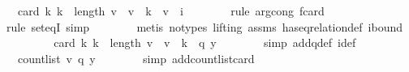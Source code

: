 \begin{isabellebody}
\ {\isachardoublequoteopen}{\isachardot}{\kern0pt}{\isachardot}{\kern0pt}{\isachardot}{\kern0pt}\ {\isacharequal}{\kern0pt}\ card\ {\isacharbraceleft}{\kern0pt}k{\isachardot}{\kern0pt}\ k\ {\isacharless}{\kern0pt}\ length\ v\ {\isasymand}\ v\ {\isacharbang}{\kern0pt}\ k\ {\isacharequal}{\kern0pt}\ v\ {\isacharbang}{\kern0pt}\ i{\isacharbraceright}{\kern0pt}{\isachardoublequoteclose}\isanewline
\ \ \ \ \ \ \isamarkupfalse%
\ {\isacharparenleft}{\kern0pt}rule\ arg{\isacharunderscore}{\kern0pt}cong{\isacharbrackleft}{\kern0pt}\ f{\isacharequal}{\kern0pt}{\isachardoublequoteopen}card{\isachardoublequoteclose}{\isacharbrackright}{\kern0pt}{\isacharparenright}{\kern0pt}\isanewline
\ \ \ \ \ \ \isamarkupfalse%
\ {\isacharparenleft}{\kern0pt}rule\ set{\isacharunderscore}{\kern0pt}eqI{\isacharcomma}{\kern0pt}\ simp{\isacharparenright}{\kern0pt}\isanewline
\ \ \ \ \ \ \isamarkupfalse%
\ {\isacharparenleft}{\kern0pt}metis\ {\isacharparenleft}{\kern0pt}no{\isacharunderscore}{\kern0pt}types{\isacharcomma}{\kern0pt}\ lifting{\isacharparenright}{\kern0pt}\ assms{\isacharparenleft}{\kern0pt}{}{\isacharparenright}{\kern0pt}\ has{\isacharunderscore}{\kern0pt}eq{\isacharunderscore}{\kern0pt}relation{\isacharunderscore}{\kern0pt}def\ i{\isacharunderscore}{\kern0pt}bound{\isacharparenright}{\kern0pt}\isanewline
\ \ \ \ \isamarkupfalse%
\ \isamarkupfalse%
\ {\isachardoublequoteopen}{\isachardot}{\kern0pt}{\isachardot}{\kern0pt}{\isachardot}{\kern0pt}\ {\isacharequal}{\kern0pt}\ card\ {\isacharbraceleft}{\kern0pt}k{\isachardot}{\kern0pt}\ k\ {\isacharless}{\kern0pt}\ length\ v\ {\isasymand}\ v\ {\isacharbang}{\kern0pt}\ k\ {\isacharequal}{\kern0pt}\ q\ y{\isacharbraceright}{\kern0pt}{\isachardoublequoteclose}\isanewline
\ \ \ \ \ \ \isamarkupfalse%
\ {\isacharparenleft}{\kern0pt}simp\ add{\isacharcolon}{\kern0pt}q{\isacharunderscore}{\kern0pt}def\ i{\isacharunderscore}{\kern0pt}def{\isacharparenright}{\kern0pt}\isanewline
\ \ \ \ \isamarkupfalse%
\ \isamarkupfalse%
\ {\isachardoublequoteopen}{\isachardot}{\kern0pt}{\isachardot}{\kern0pt}{\isachardot}{\kern0pt}\ {\isacharequal}{\kern0pt}\ count{\isacharunderscore}{\kern0pt}list\ v\ {\isacharparenleft}{\kern0pt}q\ y{\isacharparenright}{\kern0pt}{\isachardoublequoteclose}\isanewline
\ \ \ \ \ \ \isamarkupfalse%
\ {\isacharparenleft}{\kern0pt}simp\ add{\isacharcolon}{\kern0pt}count{\isacharunderscore}{\kern0pt}list{\isacharunderscore}{\kern0pt}card{\isacharparenright}{\kern0pt}\isanewline

\end{isabellebody}
